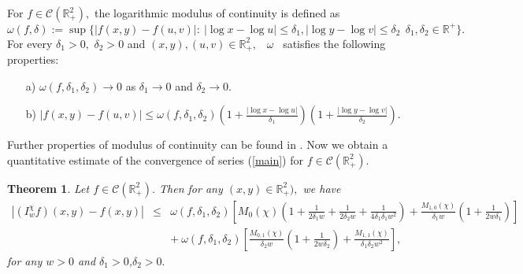 \documentclass[12pt]{article}
\newtheorem{thm}{Theorem}[section]
\begin{document}
{For $f \in \mathcal{C}(\mathbb{R}^{2}_{+}),$ the logarithmic modulus of continuity is defined as
$$ \omega(f,\delta):= \sup \{|f(x,y)-f(u,v)|: \  |\log x-\log u| \leq \delta_{1},|\log y-\log v| \leq \delta_{2}\  \ \delta_{1},\delta_{2} \in \mathbb{R}^{+}\} .$$
For every $\delta_{1} > 0,$ $\delta_{2} > 0$ and $(x,y),(u,v) \in \mathbb{R}^{2}_{+},$ \ $\omega$ \ satisfies the following properties:
\begin{itemize}
\item[a)] $\omega(f, \delta_{1},\delta_{2}) \rightarrow 0$ as $\delta_{1} \rightarrow 0$ and $\delta_{2} \rightarrow 0 .$
\item[b)] $|f(x,y) - f(u,v)| \leq \omega(f,\delta_{1},\delta_{2}) \left( 1+ \frac{|\log x - \log u|}{\delta_{1}} \right)\left( 1+ \frac{|\log y - \log v|}{\delta_{2}} \right).$
\end{itemize}
Further properties of modulus of continuity can be found in \cite{mamedeo,bardaro9}. Now we obtain a quantitative estimate of the convergence of series (\ref{main}) for $ f \in \mathcal{C}(\mathbb{R}^{2}_{+}).$

\begin{thm}\label{t3}
Let $ f \in \mathcal{C}(\mathbb{R}^{2}_{+}).$ Then for any $(x,y)\in\mathbb{R}^{2}_{+}),$ we have
\begin{eqnarray*}
|(I_{w}^{\chi}f)(x,y) - f(x,y)| &\leq &  \omega(f,\delta_{1},\delta_{2}) \left[  M_{0}(\chi) \left(  1+ \frac{1}{2 \delta_{1}w}+ \frac{1}{2 \delta_{2}w}+ \frac{1}{4 \delta_{1} \delta_{1} w^{2}}\right) + \frac{M_{1,0}(\chi)}{\delta_{1}w} \left(1+ \frac{1}{2w \delta_{1}}  \right) \right] \\&&
+ \ \omega(f,\delta_{1},\delta_{2}) \left[ \frac{M_{0,1}(\chi)}{\delta_{2}w} \left(1+ \frac{1}{2w \delta_{2}}  \right)+  \frac{M_{1,1}(\chi)}{\delta_{1} \delta_{2} w^{2}} \right],
\end{eqnarray*}
for any $w>0$ and $\delta_{1}>0$,$\delta_{2}>0.$
\end{thm}

}
\end{document}
